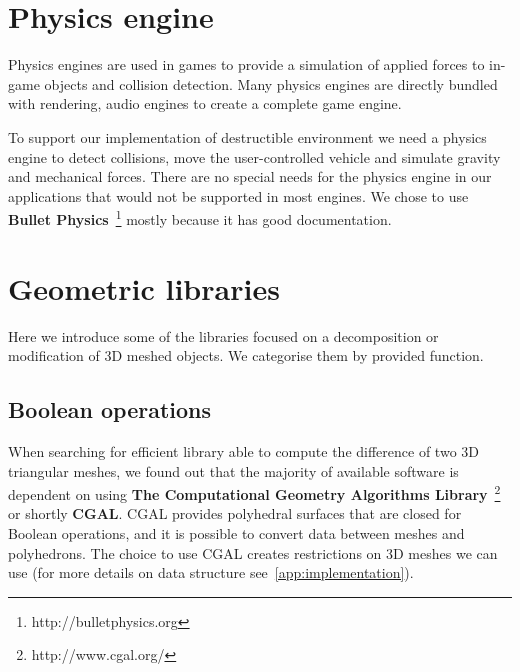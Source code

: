 
\section{Physics engine}
Physics engines are used in games to provide a simulation of applied forces to in-game objects and collision detection. Many physics engines are directly bundled with rendering, audio engines to create a complete game engine. 

To support our implementation of destructible environment we need a physics engine to detect collisions, move the user-controlled vehicle and simulate gravity and mechanical forces. There are no special needs for the physics engine in our applications that would not be supported in most engines. We chose to use \textbf{Bullet Physics}~\footnote{http://bulletphysics.org} mostly because it has good documentation. 

\section{Geometric libraries}
Here we introduce  some of the libraries focused on a decomposition or modification of 3D meshed objects. We categorise them by provided function. 

\subsection{Boolean operations}
When searching for efficient library able to compute the difference of two 3D triangular meshes, we found out that the majority of available software  is dependent on using \textbf{The Computational Geometry Algorithms Library}~\footnote{http://www.cgal.org/} or shortly \textbf{CGAL}. CGAL provides polyhedral surfaces that are closed for Boolean operations, and it is possible to convert data between meshes and polyhedrons. The choice to use CGAL creates restrictions on 3D meshes we can use (for more details on data structure see~\cref{app:implementation}).

